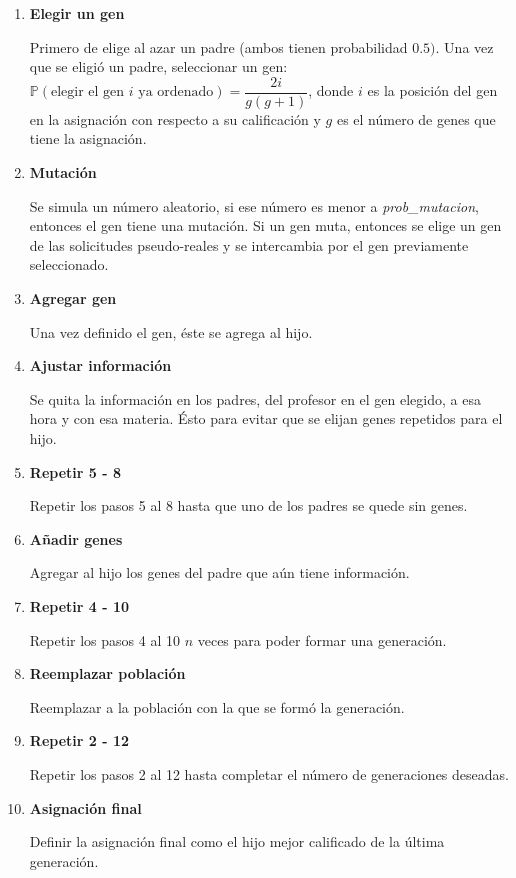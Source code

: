 \begin{enumerate}
\item \textbf{Elegir un gen}

Primero de elige al azar un padre (ambos tienen probabilidad $0.5)$. Una vez que se eligió un padre, seleccionar un gen: $\mathbb{P}(\text{elegir el gen } i \text{ ya ordenado}) = \dfrac{2i}{g(g+1)}$, donde $i$ es la posición del gen en la asignación con respecto a su calificación y $g$ es el número de genes que tiene la asignación.

\item \textbf{Mutación}

Se simula un número aleatorio, si ese número es menor a \textit{prob\_mutacion}, entonces el gen tiene una mutación. Si un gen muta, entonces se elige un gen de las solicitudes pseudo-reales y se intercambia por el gen previamente seleccionado.

\item \textbf{Agregar gen}

Una vez definido el gen, éste se agrega al hijo.

\item \textbf{Ajustar información}

Se quita la información en los padres, del profesor en el gen elegido, a esa hora y con esa materia. Ésto para evitar que se elijan genes repetidos para el hijo.

\item \textbf{Repetir 5 - 8}

Repetir los pasos 5 al 8 hasta que uno de los padres se quede sin genes.

\item \textbf{Añadir genes}

Agregar al hijo los genes del padre que aún tiene información.

\item \textbf{Repetir 4 - 10}

Repetir los pasos 4 al 10 $n$ veces para poder formar una generación.

\item \textbf{Reemplazar población}

Reemplazar a la población con la que se formó la generación.

\item \textbf{Repetir 2 - 12}

Repetir los pasos 2 al 12 hasta completar el número de generaciones deseadas.

\item \textbf{Asignación final}

Definir la asignación final como el hijo mejor calificado de la última generación.
\end{enumerate}


